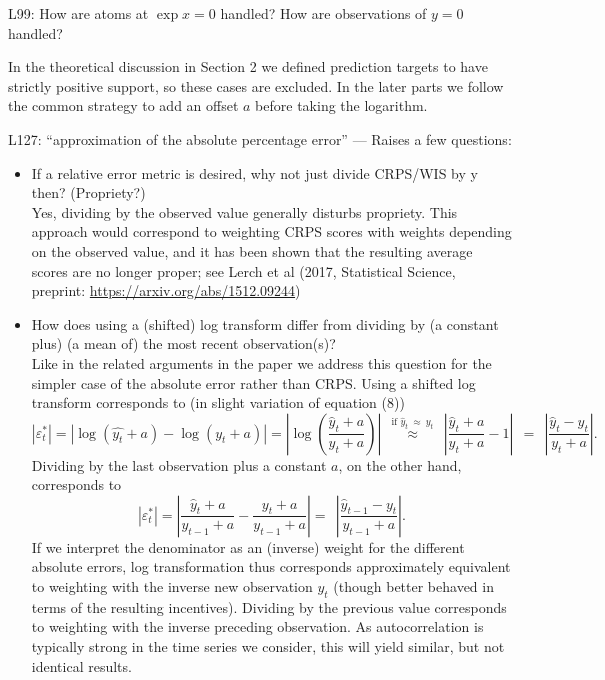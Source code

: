 \documentclass{article}
\newcommand{\black}{\color{black}}
\newcommand{\blue}{\color{blue}}
\begin{document}
\blue
L99: How are atoms at $\exp x = 0$ handled? How are observations of $y = 0$ handled?

\black
In the theoretical discussion in Section 2 we defined prediction targets to have strictly positive support, so these cases are excluded. In the later parts we follow the common strategy to add an offset $a$ before taking the logarithm. 

\blue

L127: “approximation of the absolute percentage error” — Raises a few questions:
\begin{itemize}
    \item If a relative error metric is desired, why not just divide CRPS/WIS by y then? (Propriety?)\\
    \black
Yes, dividing by the observed value generally disturbs propriety. This approach would correspond to weighting CRPS scores with weights depending on the observed value, and it has been shown that the resulting average scores are no longer proper; see Lerch et al (2017, Statistical Science, preprint: \url{https://arxiv.org/abs/1512.09244})
    \item \blue How does using a (shifted) log transform differ from dividing by (a constant plus) (a mean of) the most recent observation(s)?\\
    \black Like in the related arguments in the paper we address this question for the simpler case of the absolute error rather than CRPS. Using a shifted log transform corresponds to (in slight variation of equation (8))
    \begin{equation}
    |\varepsilon^*_t| = |\log (\hat{y_t} + a) - \log(y_t + a)| = \left|\log\left(\frac{\hat{y}_t + a}{y_t + a}\right) \right| \ \ \stackrel{\text{if } \hat{y}_t \ \approx \ y_t}{\approx} \ \ \left| \frac{\hat{y}_t + a}{y_t + a} - 1 \right| \ \ = \ \ \left| \frac{\hat{y}_t - y_t}{y_t + a} \right|.
    \end{equation}
    Dividing by the last observation plus a constant $a$, on the other hand, corresponds to
    \begin{equation}
    |\varepsilon^*_t| = \left|\frac{\hat{y}_t + a}{y_{t - 1} + a} - \frac{y_t + a}{y_{t - 1} + a} \right| = \ \ \left| \frac{\hat{y}_{t - 1} - y_t}{y_{t - 1} + a} \right|.
    \end{equation}
    If we interpret the denominator as an (inverse) weight for the different absolute errors, log transformation thus corresponds approximately equivalent to weighting with the inverse new observation $y_t$ (though better behaved in terms of the resulting incentives). Dividing by the previous value corresponds to weighting with the inverse preceding observation. As autocorrelation is typically strong in the time series we consider, this will yield similar, but not identical results.\\

\end{itemize}
\end{document}
